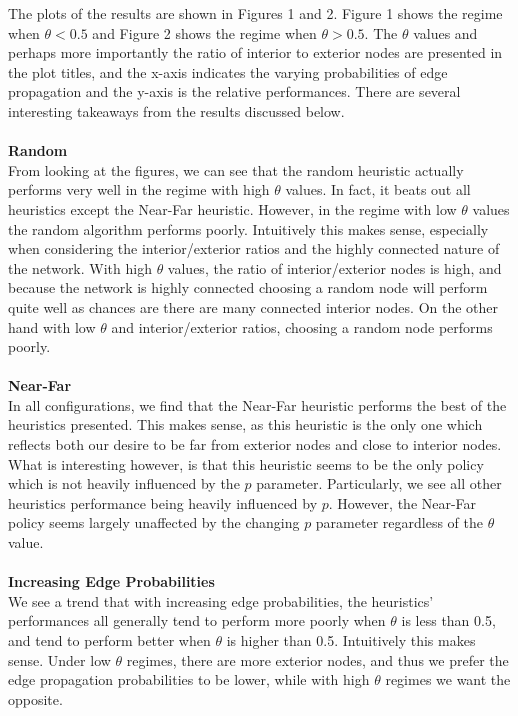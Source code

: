 \documentclass{article}
\begin{document}
The plots of the results are shown in Figures 1 and 2. Figure 1 shows the regime when $\theta < 0.5$ and Figure 2 shows the regime when $\theta > 0.5$. The $\theta$ values and perhaps more importantly the ratio of interior to exterior nodes are presented in the plot titles, and the x-axis indicates the varying probabilities of edge propagation and the y-axis is the relative performances. There are several interesting takeaways from the results discussed below.
\\ \\
\textbf{Random} \\
From looking at the figures, we can see that the random heuristic actually performs very well in the regime with high $\theta$ values. In fact, it beats out all heuristics except the Near-Far heuristic. However, in the regime with low $\theta$ values the random algorithm performs poorly. Intuitively this makes sense, especially when considering the interior/exterior ratios and the highly connected nature of the network. With high $\theta$ values, the ratio of interior/exterior nodes is high, and because the network is highly connected choosing a random node will perform quite well as chances are there are many connected interior nodes. On the other hand with low $\theta$ and interior/exterior ratios, choosing a random node performs poorly.
\\ \\
\textbf{Near-Far} \\ 
In all configurations, we find that the Near-Far heuristic performs the best of the heuristics presented. This makes sense, as this heuristic is the only one which reflects both our desire to be far from exterior nodes and close to interior nodes. What is interesting however, is that this heuristic seems to be the only policy which is not heavily influenced by the $p$ parameter. Particularly, we see all other heuristics performance being heavily influenced by $p$. However, the Near-Far policy seems largely unaffected by the changing $p$ parameter regardless of the $\theta$ value.
\\ \\
\textbf{ Increasing Edge Probabilities} \\
We see a trend that with increasing edge probabilities, the heuristics' performances all generally tend to perform more poorly when $\theta$ is less than 0.5, and tend to perform better when $\theta$ is higher than 0.5. Intuitively this makes sense. Under low $\theta$ regimes, there are more exterior nodes, and thus we prefer the edge propagation probabilities to be lower, while with high $\theta$ regimes we want the opposite. 
\end{document}
